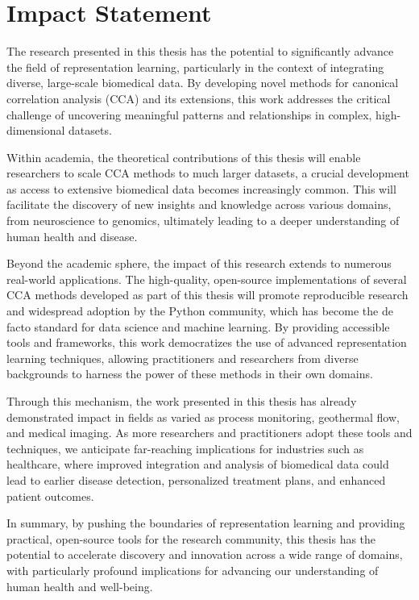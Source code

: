 \chapter*{Impact Statement}

The research presented in this thesis has the potential to significantly advance the field of representation learning, particularly in the context of integrating diverse, large-scale biomedical data. By developing novel methods for canonical correlation analysis (CCA) and its extensions, this work addresses the critical challenge of uncovering meaningful patterns and relationships in complex, high-dimensional datasets.

Within academia, the theoretical contributions of this thesis will enable researchers to scale CCA methods to much larger datasets, a crucial development as access to extensive biomedical data becomes increasingly common. This will facilitate the discovery of new insights and knowledge across various domains, from neuroscience to genomics, ultimately leading to a deeper understanding of human health and disease.

Beyond the academic sphere, the impact of this research extends to numerous real-world applications. The high-quality, open-source implementations of several CCA methods developed as part of this thesis will promote reproducible research and widespread adoption by the Python community, which has become the de facto standard for data science and machine learning. By providing accessible tools and frameworks, this work democratizes the use of advanced representation learning techniques, allowing practitioners and researchers from diverse backgrounds to harness the power of these methods in their own domains.

Through this mechanism, the work presented in this thesis has already demonstrated impact in fields as varied as process monitoring, geothermal flow, and medical imaging. As more researchers and practitioners adopt these tools and techniques, we anticipate far-reaching implications for industries such as healthcare, where improved integration and analysis of biomedical data could lead to earlier disease detection, personalized treatment plans, and enhanced patient outcomes.

In summary, by pushing the boundaries of representation learning and providing practical, open-source tools for the research community, this thesis has the potential to accelerate discovery and innovation across a wide range of domains, with particularly profound implications for advancing our understanding of human health and well-being.